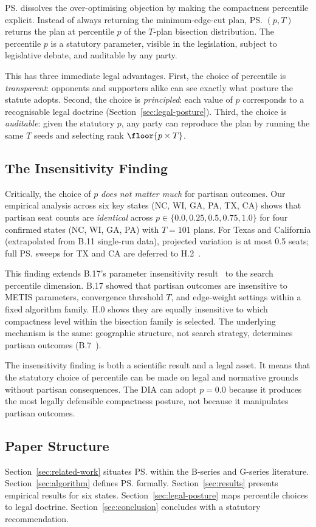 \ps{} dissolves the over-optimising objection by making the compactness
percentile explicit.
Instead of always returning the minimum-edge-cut plan, \ps{}$(p, T)$ returns
the plan at percentile $p$ of the $T$-plan bisection distribution.
The percentile $p$ is a statutory parameter, visible in the legislation,
subject to legislative debate, and auditable by any party.

This has three immediate legal advantages.
First, the choice of percentile is \emph{transparent}: opponents and
supporters alike can see exactly what posture the statute adopts.
Second, the choice is \emph{principled}: each value of $p$ corresponds to
a recognisable legal doctrine (Section~\ref{sec:legal-posture}).
Third, the choice is \emph{auditable}: given the statutory $p$, any party
can reproduce the plan by running the same $T$ seeds and selecting rank
$\floor{p \times T}$.

\subsection{The Insensitivity Finding}

Critically, the choice of $p$ \emph{does not matter much} for partisan
outcomes.
Our empirical analysis across six key states (NC, WI, GA, PA, TX, CA) shows
that partisan seat counts are \emph{identical} across $p \in \{0.0, 0.25, 0.5,
0.75, 1.0\}$ for four confirmed states (NC, WI, GA, PA) with $T = 101$ plans.
For Texas and California (extrapolated from B.11 single-run data), projected
variation is at most 0.5 seats; full \ps{} sweeps for TX and CA are deferred
to H.2~\citep{h2paper}.

This finding extends B.17's parameter insensitivity result~\citep{b17paper}
to the search percentile dimension.
B.17 showed that partisan outcomes are insensitive to METIS parameters,
convergence threshold $T$, and edge-weight settings within a fixed algorithm
family.
H.0 shows they are equally insensitive to which compactness level within
the bisection family is selected.
The underlying mechanism is the same: geographic structure, not search
strategy, determines partisan outcomes (B.7~\citep{b7paper}).

The insensitivity finding is both a scientific result and a legal asset.
It means that the statutory choice of percentile can be made on legal and
normative grounds without partisan consequences.
The DIA can adopt $p = 0.0$ because it produces the most legally defensible
compactness posture, not because it manipulates partisan outcomes.

\subsection{Paper Structure}

Section~\ref{sec:related-work} situates \ps{} within the B-series
and G-series literature.
Section~\ref{sec:algorithm} defines \ps{} formally.
Section~\ref{sec:results} presents empirical results for six states.
Section~\ref{sec:legal-posture} maps percentile choices to legal doctrine.
Section~\ref{sec:conclusion} concludes with a statutory recommendation.
